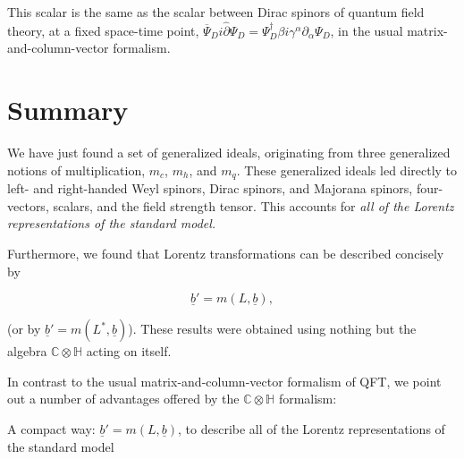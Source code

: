 \documentclass[letterpaper,12pt,titlepage,oneside,final]{book}
\newcommand{\CH}{\mathbb{C}\otimes\mathbb{H}}
\begin{document}
This scalar is the same as the scalar between Dirac spinors of quantum field theory, at a fixed space-time point, ${\overline{\Psi}}_D i \hat{\partial} {\Psi}_D = {{\Psi}}^{\dagger}_D  \beta i \gamma^{\alpha} \partial_{\alpha} {\Psi}_D$, in the usual matrix-and-column-vector formalism.  

\section{Summary\label{adv}  }


We have just found a set of generalized ideals, originating from three generalized notions of multiplication, $m_c$, $m_h$, and $m_q$.  These generalized ideals led directly to left- and right-handed Weyl spinors, Dirac spinors, and Majorana spinors, four-vectors, scalars, and the field strength tensor.  This accounts for \it all \rm of the Lorentz representations of the standard model.  

\noindent Furthermore, we found that Lorentz transformations can be described concisely by 

\begin{equation}\underline{b}' = m(L,\underline{b}),  
\end{equation}

\noindent (or by  $\underline{b}' = m(L^*,\underline{b})$).  These results were obtained using nothing but the algebra $\CH$ acting on itself.   

\vspace{1cm}

\noindent In contrast to the usual matrix-and-column-vector formalism of  QFT, we point out a number of advantages offered by the $\CH$ formalism:

\vspace{0.5cm}

\noindent * A compact way:  $\underline{b}' = m(L,\underline{b})$, to describe all of the Lorentz representations of the standard model

\end{document}
